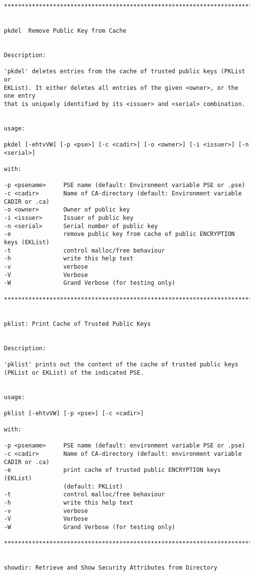 {\begin{verbatim}
****************************************************************************************


pkdel  Remove Public Key from Cache


Description:

'pkdel' deletes entries from the cache of trusted public keys (PKList or
EKList). It either deletes all entries of the given <owner>, or the one entry
that is uniquely identified by its <issuer> and <serial> combination.


usage:

pkdel [-ehtvVW] [-p <pse>] [-c <cadir>] [-o <owner>] [-i <issuer>] [-n <serial>]

with:

-p <psename>     PSE name (default: Environment variable PSE or .pse)
-c <cadir>       Name of CA-directory (default: Environment variable CADIR or .ca)
-o <owner>       Owner of public key
-i <issuer>      Issuer of public key
-n <serial>      Serial number of public key
-e               remove public key from cache of public ENCRYPTION keys (EKList)
-t               control malloc/free behaviour
-h               write this help text
-v               verbose
-V               Verbose
-W               Grand Verbose (for testing only)

****************************************************************************************


pklist: Print Cache of Trusted Public Keys


Description:

'pklist' prints out the content of the cache of trusted public keys
(PKList or EKList) of the indicated PSE.


usage:

pklist [-ehtvVW] [-p <pse>] [-c <cadir>]

with:

-p <psename>     PSE name (default: environment variable PSE or .pse)
-c <cadir>       Name of CA-directory (default: environment variable CADIR or .ca)
-e               print cache of trusted public ENCRYPTION keys (EKList)
                 (default: PKList)
-t               control malloc/free behaviour
-h               write this help text
-v               verbose
-V               Verbose
-W               Grand Verbose (for testing only)

****************************************************************************************


showdir: Retrieve and Show Security Attributes from Directory



\end{verbatim}}
